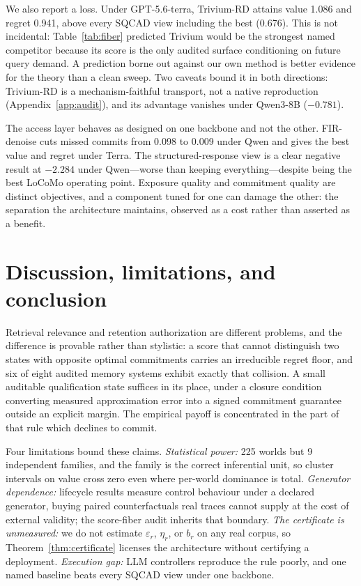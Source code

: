 \documentclass{article}
\newcommand{\SQCAD}{\textsc{SQCAD}}
\begin{document}
We also report a loss. Under GPT-5.6-terra, Trivium-RD attains value 1.086 and
regret 0.941, above every \SQCAD{} view including the best (0.676). This is not
incidental: Table~\ref{tab:fiber} predicted Trivium would be the strongest named
competitor because its score is the only audited surface conditioning on future
query demand. A prediction borne out against our own method is better evidence for
the theory than a clean sweep. Two caveats bound it in both directions: Trivium-RD
is a mechanism-faithful transport, not a native reproduction
(Appendix~\ref{app:audit}), and its advantage vanishes under Qwen3-8B ($-0.781$).

The access layer behaves as designed on one backbone and not the other.
FIR-denoise cuts missed commits from 0.098 to 0.009 under Qwen and gives the best
value and regret under Terra. The structured-response view is a clear negative
result at $-2.284$ under Qwen---worse than keeping everything---despite being the
best LoCoMo operating point. Exposure quality and commitment quality are distinct
objectives, and a component tuned for one can damage the other: the separation the
architecture maintains, observed as a cost rather than asserted as a benefit.


\section{Discussion, limitations, and conclusion}
Retrieval relevance and retention authorization are different problems, and the
difference is provable rather than stylistic: a score that cannot distinguish two
states with opposite optimal commitments carries an irreducible regret floor, and
six of eight audited memory systems exhibit exactly that collision. A small
auditable qualification state suffices in its place, under a closure condition
converting measured approximation error into a signed commitment guarantee outside
an explicit margin. The empirical payoff is concentrated in the part of that rule
which declines to commit.

Four limitations bound these claims. \emph{Statistical power:} 225 worlds but 9
independent families, and the family is the correct inferential unit, so cluster
intervals on value cross zero even where per-world dominance is total.
\emph{Generator dependence:} lifecycle results measure control behaviour under a
declared generator, buying paired counterfactuals real traces cannot supply at the
cost of external validity; the score-fiber audit inherits that boundary.
\emph{The certificate is unmeasured:} we do not estimate $\varepsilon_r$, $\eta_r$,
or $b_r$ on any real corpus, so Theorem~\ref{thm:certificate} licenses the
architecture without certifying a deployment. \emph{Execution gap:} LLM controllers
reproduce the rule poorly, and one named baseline beats every \SQCAD{} view under one
backbone.
\end{document}
